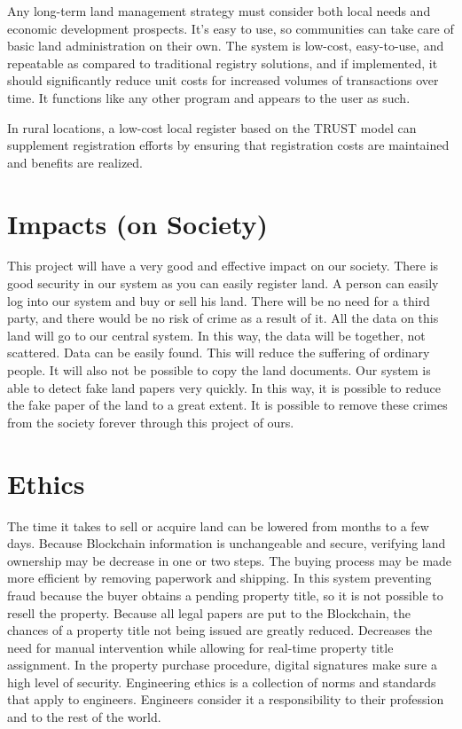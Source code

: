 \documentclass[12pt]{ucthesis}
\begin{document}
Any long-term land management strategy must consider both local needs and economic development prospects. It's easy to use, so communities can take care of basic land administration on their own. The system is low-cost, easy-to-use, and repeatable as compared to traditional registry solutions, and if implemented, it should significantly reduce unit costs for increased volumes of transactions over time. It functions like any other program and appears to the user as such.

In rural locations, a low-cost local register based on the TRUST model can supplement registration efforts by ensuring that registration costs are maintained and benefits are realized.

\section{Impacts (on Society)}
\label{impacts}
    
This project will have a very good and effective impact on our society. There is good security in our system as you can easily register land. A person can easily log into our system and buy or sell his land. There will be no need for a third party, and there would be no risk of crime as a result of it.  All the data on this land will go to our central system. In this way, the data will be together, not scattered. Data can be easily found. This will reduce the suffering of ordinary people. It will also not be possible to copy the land documents. Our system is able to detect fake land papers very quickly. In this way, it is possible to reduce the fake paper of the land to a great extent. It is possible to remove these crimes from the society forever through this project of ours. 
    

\section{Ethics}
\label{ethics}
    
The time it takes to sell or acquire land can be lowered from months to a few days. Because Blockchain information is unchangeable and secure, verifying land ownership may be decrease in one or two steps. The buying process may be made more efficient by removing paperwork and shipping. In this system preventing fraud because the buyer obtains a pending property title,  so it is not possible to resell the property. Because all legal papers are put to the Blockchain, the chances of a property title not being issued are greatly reduced. Decreases the need for manual intervention while allowing for real-time property title assignment. In the property purchase procedure, digital signatures make sure a high level of security. Engineering ethics is a collection of norms and standards that apply to engineers. Engineers consider it a responsibility to their profession and to the rest of the world.
\end{document}

